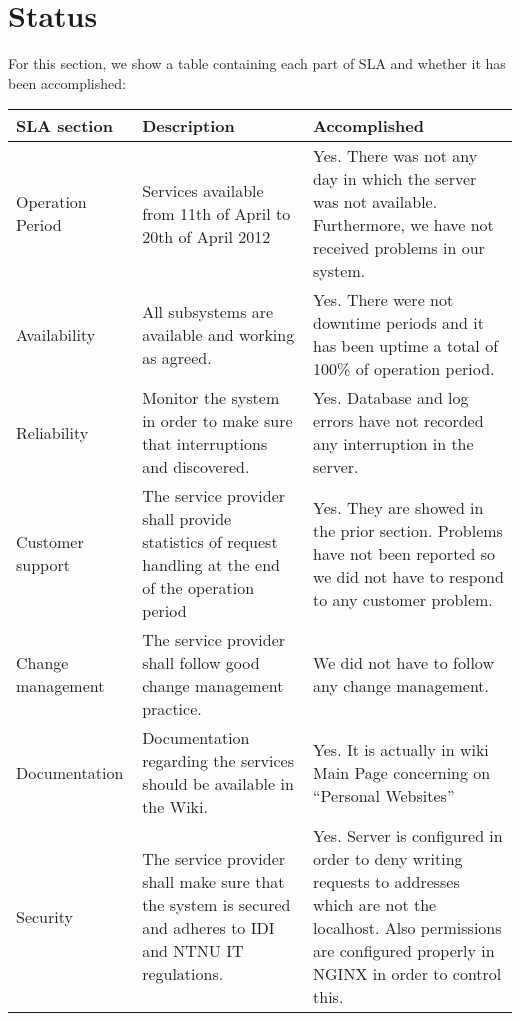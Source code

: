 \section{Status}
For this section, we show a table containing each part of  SLA and whether it has been accomplished: \\
\begin{tabular}{ | p{5cm} | p{5cm} | p{5cm}| }
\hline
\textbf{SLA section} & \textbf{Description} & \textbf{Accomplished} \\ \hline
Operation Period & Services available from 11th of April to 20th of April 2012 & Yes. There was not any day in which the server was not available. Furthermore, we have not received problems in our system. \\ \hline
Availability & All subsystems are available and working as agreed. & Yes. There were not downtime periods and it has been uptime a total of 100\% of operation period. \\ \hline
Reliability & Monitor the system in order to make sure that interruptions and discovered. & Yes. Database and log errors have not recorded any interruption in the server. \\ \hline
Customer support & The service provider shall provide statistics of request handling at the end of the operation period & Yes. They are showed in the prior section. Problems have not been reported so we did not have to respond to any customer problem. \\ \hline
Change management & The service provider shall follow good change management practice. & We did not have to follow any change management. \\ \hline
Documentation & Documentation regarding the services should be available in the Wiki. & Yes. It is actually in wiki Main Page concerning on “Personal Websites” \\ \hline
Security & The service provider shall make sure that the system is secured and adheres to IDI and NTNU IT regulations. & Yes. Server is configured in order to deny writing requests to addresses which are not the localhost. Also permissions are configured properly in NGINX in order to control this. \\ \hline
\end{tabular}
\pagebreak